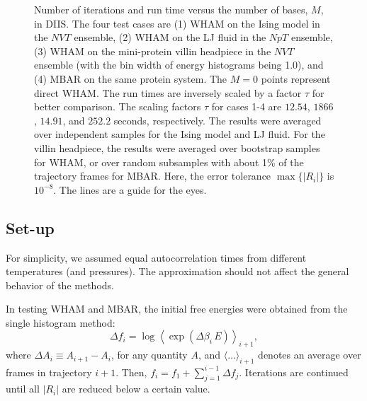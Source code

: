 \documentclass[reprint,aip,jcp,superscriptaddress]{revtex4-1}
\begin{document}
\begin{figure}[h]
  \caption{
    \label{fig:nsnt}
    Number of iterations
    and run time
    versus the number of bases, $M$,
    in DIIS.
    The four test cases are
    (1) WHAM on the Ising model in the $NVT$ ensemble,
    (2) WHAM on the LJ fluid in the $NpT$ ensemble,
    (3) WHAM on the mini-protein villin headpiece in the $NVT$ ensemble
    (with the bin width of energy histograms being 1.0), and
    (4) MBAR on the same protein system.
    The $M = 0$ points represent direct WHAM.
    The run times are inversely scaled
    by a factor $\tau$
    for better comparison.
    The scaling factors $\tau$ for cases 1-4 are
    $12.54$, $1866$, $14.91$, and $252.2$ seconds,
    respectively.
    The results were averaged
    over independent samples
    for the Ising model and LJ fluid.
    For the villin headpiece,
    the results were averaged over
    bootstrap\cite{
    newman, efron1979, hub2010}
    samples for WHAM,
    or over random subsamples with about 1\% of the trajectory frames
    for MBAR.
    Here, the error tolerance
    $\max \{ |R_i| \}$ is $10^{-8}$.
    The lines are a guide for the eyes.
  }
\end{figure}





\subsection{\label{sec:results_setup}
Set-up}



For simplicity,
we assumed equal autocorrelation times
from different temperatures (and pressures).
%
The approximation should not affect
the general behavior of the methods.



In testing WHAM and MBAR,
the initial free energies were obtained from
the single histogram method:
%
\begin{equation*}
\Delta f_i
=
\log
\left\langle
  \exp\left(
    \Delta \beta_i \, E
  \right)
\right\rangle_{i+1},
\end{equation*}
%
where $\Delta A_i \equiv A_{i+1} - A_i$,
for any quantity $A$,
and
$\langle\dots\rangle_{i + 1}$
denotes an average over frames in trajectory $i + 1$.
%
Then, $f_i = f_1 + \sum_{j = 1}^{i - 1} \Delta f_j$.
%
%
Iterations are continued
until all $|R_i|$ are reduced
below a certain value.
\end{document}
